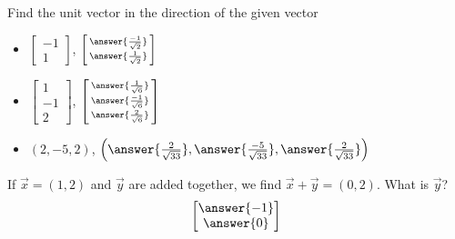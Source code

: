 \documentclass{ximera}
\begin{document}
\begin{exercise}%
    Find the unit vector in the direction of the given vector
    \begin{itemize}
        \item  $\begin{bmatrix} -1 \\ 1 \end{bmatrix}$, $\left[\begin{smallmatrix} \answer{\frac{-1}{\sqrt{2}}} \\ \answer{\frac{1}{\sqrt{2}}} \end{smallmatrix}\right]$
        \item $\begin{bmatrix} 1 \\ -1 \\ 2 \end{bmatrix}$, $\left[\begin{smallmatrix} \answer{\frac{1}{\sqrt{6}}} \\ \answer{\frac{-1}{\sqrt{6}}} \\ \answer{\frac{2}{\sqrt{6}}} \end{smallmatrix}\right]$
        \item $(2,-5,2)$, $\left( \answer{\frac{2}{\sqrt{33}}}, \answer{\frac{-5}{\sqrt{33}}}, \answer{\frac{2}{\sqrt{33}}} \right)$
    \end{itemize}
\end{exercise}

\begin{exercise}
    If $\vec{x} = (1,2)$ and $\vec{y}$ are added together, we find $\vec{x}+\vec{y} = (0,2)$.  What is $\vec{y}$?
    \[
        \begin{bmatrix}  \answer{-1} \\ \answer{0}  \end{bmatrix}
    \]
\end{exercise}
\end{document}
